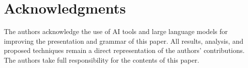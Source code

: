 \section*{Acknowledgments}

The authors acknowledge the use of AI tools and large language models
for improving the presentation and grammar of this paper.
All results, analysis, and proposed techniques remain a direct
representation of the authors' contributions.
The authors take full responsibility for the contents of this paper.
